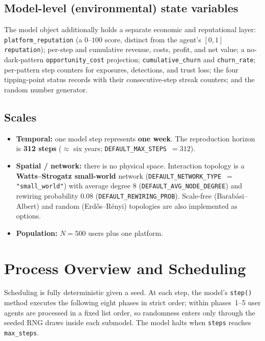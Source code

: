 \documentclass[11pt]{article}
\newcommand{\code}[1]{\texttt{#1}}
\begin{document}
\subsection{Model-level (environmental) state variables}

The model object additionally holds a separate economic and reputational layer:
\code{platform\_reputation} (a $0$--$100$ score, distinct from the agent's
$[0,1]$ \code{reputation}); per-step and cumulative revenue, costs, profit, and
net value; a no-dark-pattern \code{opportunity\_cost} projection;
\code{cumulative\_churn} and \code{churn\_rate}; per-pattern step counters for
exposures, detections, and trust loss; the four tipping-point status records
with their consecutive-step streak counters; and the random number generator.

\subsection{Scales}

\begin{itemize}
  \item \textbf{Temporal:} one model step represents \textbf{one week}. The
  reproduction horizon is \textbf{312 steps} ($\approx$ six years;
  \code{DEFAULT\_MAX\_STEPS}~$=312$).
  \item \textbf{Spatial / network:} there is no physical space. Interaction
  topology is a \textbf{Watts--Strogatz small-world} network
  (\code{DEFAULT\_NETWORK\_TYPE}~$=$ \code{"small\_world"}) with average degree
  $8$ (\code{DEFAULT\_AVG\_NODE\_DEGREE}) and rewiring probability $0.08$
  (\code{DEFAULT\_REWIRING\_PROB}). Scale-free (Barab\'asi--Albert) and random
  (Erd\H{o}s--R\'enyi) topologies are also implemented as options.
  \item \textbf{Population:} $N = 500$ users plus one platform.
\end{itemize}

\section{Process Overview and Scheduling}
\label{sec:scheduling}

Scheduling is fully deterministic given a seed. At each step, the model's
\code{step()} method executes the following eight phases in strict order;
within phases~1--5 user agents are processed in a fixed list order, so
randomness enters only through the seeded RNG draws inside each submodel. The
model halts when \code{steps} reaches \code{max\_steps}.
\end{document}
